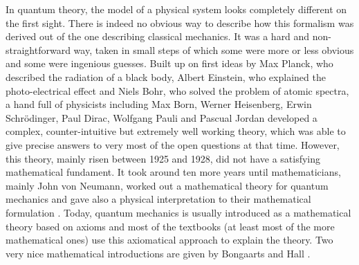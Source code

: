 In quantum theory, the model of a physical system looks completely different on 
the first sight. There is indeed no obvious way to describe how this formalism was 
derived out of the one describing classical mechanics. It was a hard 
and non-straightforward way, taken in small steps of which some were 
more or less obvious and some were ingenious guesses. Built up on first ideas 
by Max Planck, who described the radiation of a black body, Albert Einstein, 
who explained the photo-electrical effect and Niels Bohr, who solved the 
problem of atomic spectra, a hand full of physicists including Max Born, 
Werner Heisenberg, Erwin Schr\"odinger, Paul Dirac, Wolfgang Pauli and Pascual 
Jordan developed a complex, counter-intuitive but extremely well working theory, 
which was able to give precise answers to very most of the open questions at that 
time. However, this theory, mainly risen between 1925 and 1928, did not have a 
satisfying mathematical fundament. It took around ten more years until 
mathematicians, mainly John von Neumann, worked out a mathematical theory for 
quantum mechanics and gave also a physical interpretation to their mathematical 
formulation \cite{vonneumann:1996a}. Today, quantum mechanics is usually 
introduced as a mathematical theory based on axioms and most of the textbooks 
(at least most of the more mathematical ones) use this axiomatical approach to 
explain the theory. Two very nice mathematical introductions are given by 
Bongaarts \cite{bongaarts:2015a} and Hall \cite{hall:2013a}.


